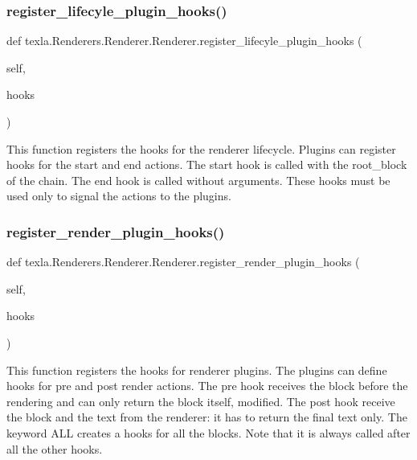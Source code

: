 \subsubsection{\texorpdfstring{register\+\_\+lifecyle\+\_\+plugin\+\_\+hooks()}{register\_lifecyle\_plugin\_hooks()}}
{\footnotesize\ttfamily def texla.\+Renderers.\+Renderer.\+Renderer.\+register\+\_\+lifecyle\+\_\+plugin\+\_\+hooks (\begin{DoxyParamCaption}\item[{}]{self,  }\item[{}]{hooks }\end{DoxyParamCaption})}

\begin{DoxyVerb}This function registers the hooks for the renderer lifecycle.
Plugins can register hooks for the start and end actions.
The start hook is called with the root_block of the chain.
The end hook is called without arguments. These hooks must be used
only to signal the actions to the plugins.\end{DoxyVerb}
 \hypertarget{classtexla_1_1Renderers_1_1Renderer_1_1Renderer_ab2a50912d83684b9cd57fc4feccedad6}{}\label{classtexla_1_1Renderers_1_1Renderer_1_1Renderer_ab2a50912d83684b9cd57fc4feccedad6} 
\subsubsection{\texorpdfstring{register\+\_\+render\+\_\+plugin\+\_\+hooks()}{register\_render\_plugin\_hooks()}}
{\footnotesize\ttfamily def texla.\+Renderers.\+Renderer.\+Renderer.\+register\+\_\+render\+\_\+plugin\+\_\+hooks (\begin{DoxyParamCaption}\item[{}]{self,  }\item[{}]{hooks }\end{DoxyParamCaption})}

\begin{DoxyVerb}This function registers the hooks for renderer plugins.
The plugins can define hooks for pre and post render actions.
The pre hook receives the block before the rendering and can
only return the block itself, modified.
The post hook receive the block and the text from the renderer:
it has to return the final text only.
The keyword ALL creates a hooks for all the blocks.
Note that it is always called after all the other hooks.\end{DoxyVerb}
 \hypertarget{classtexla_1_1Renderers_1_1Renderer_1_1Renderer_ae58221b6a1aec6777d7e6d1bbc97e254}{}\label{classtexla_1_1Renderers_1_1Renderer_1_1Renderer_ae58221b6a1aec6777d7e6d1bbc97e254} 
